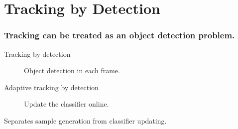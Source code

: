\section{Tracking by Detection}

\begin{frame}
    \frametitle{Tracking can be treated as an object detection problem.}
    \begin{description}
        \item [Tracking by detection] Object detection in each frame.
        \item [Adaptive tracking by detection] Update the classifier online.
    \end{description}

    Separates sample generation from classifier updating.
\end{frame}

%
%
%


